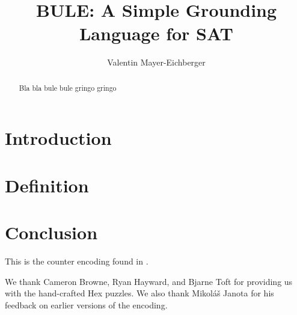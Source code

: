 \documentclass{ecai}
\begin{document}
\title{BULE: A Simple Grounding Language for SAT}
\author{Valentin Mayer-Eichberger}

\maketitle

\begin{abstract}
    Bla bla bule bule gringo gringo
\end{abstract}

\section{Introduction}
\section{Definition}
\section{Conclusion}

This is the counter encoding found in \cite{Sinz2005}.

We thank Cameron Browne, Ryan Hayward, and Bjarne Toft for providing us with
the hand-crafted Hex puzzles. We also thank Mikoláš Janota for his feedback on
earlier versions of the encoding.



\end{document}
